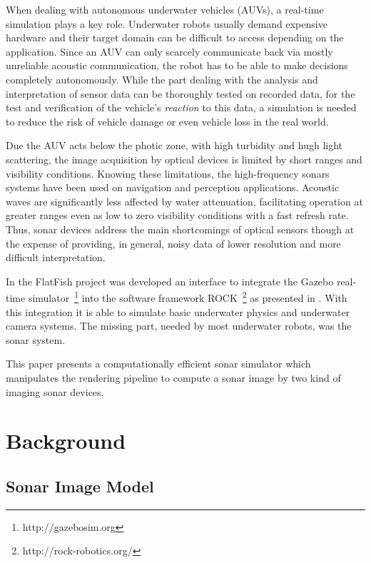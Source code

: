 \documentclass[final,5p,times]{elsarticle}
\begin{document}
When dealing with autonomous underwater vehicles (AUVs), a real-time simulation plays a key role. Underwater robots usually demand expensive hardware and their target domain can be difficult to access depending on the application. Since an AUV can only scarcely communicate back via mostly unreliable acoustic communication, the robot has to be able to make decisions completely autonomously. While the part dealing with the analysis and interpretation of sensor data can be thoroughly tested on recorded data, for the test and verification of the vehicle's \emph{reaction} to this data, a simulation is needed to reduce the risk of vehicle damage or even vehicle loss in the real world.

Due the AUV acts below the photic zone, with high turbidity and hugh light scattering, the image acquisition by optical devices is limited by short ranges and visibility conditions. Knowing these limitations, the high-frequency sonars systems have been used on navigation and perception applications. Acoustic waves are significantly less affected by water attenuation, facilitating operation at greater ranges even as low to zero visibility conditions with a fast refresh rate. Thus, sonar devices address the main shortcomings of optical sensors though at the expense of providing, in general, noisy data of lower resolution and more difficult interpretation.

In the FlatFish project \cite{albiez2015} was developed an interface to integrate the Gazebo real-time simulator~\footnote{http://gazebosim.org} into the software framework ROCK~\footnote{http://rock-robotics.org/} as presented in \cite{watanabe2015}. With this integration it is able to simulate basic underwater physics and underwater camera systems. The missing part, needed by most underwater robots, was the sonar system.

This paper presents a computationally efficient sonar simulator which manipulates the rendering pipeline to compute a sonar image by two kind of imaging sonar devices.


\section{Background}
\label{background}

\subsection{Sonar Image Model}
\label{sonar:model}
\end{document}

